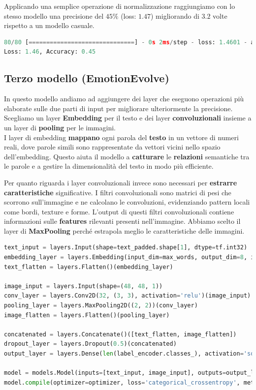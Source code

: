 \documentclass{article}
\begin{document}
Applicando una semplice operazione di normalizzazione raggiungiamo con lo stesso modello una precisione del $45\%$ (loss: $1.47$) migliorando di $3.2$ volte rispetto a un modello casuale.
\begin{lstlisting}[language=Python, caption=Risultati modello normalizzato]
80/80 [==============================] - 0s 2ms/step - loss: 1.4601 - accuracy: 0.4518 - precision_13: 0.6210 - recall_13: 0.2063
Loss: 1.46, Accuracy: 0.45
\end{lstlisting}

\subsection{Terzo modello (EmotionEvolve)}

In questo modello andiamo ad aggiungere dei layer che eseguono operazioni più elaborate sulle due parti di input per migliorare ulteriormente la precisione. Scegliamo un layer \textbf{Embedding} per il testo e dei layer \textbf{convoluzionali} insieme a un layer di \textbf{pooling} per le immagini.\\

I layer di embedding \textbf{mappano} ogni parola del \textbf{testo} in un vettore di numeri reali, dove parole simili sono rappresentate da vettori vicini nello spazio dell'embedding. Questo aiuta il modello a \textbf{catturare} le \textbf{relazioni} semantiche tra le parole e a gestire la dimensionalità del testo in modo più efficiente. 

\bigskip

Per quanto riguarda i layer convoluzionali invece sono necessari per \textbf{estrarre} \textbf{caratteristiche} significative. I filtri convoluzionali sono matrici di pesi che scorrono sull'immagine e ne calcolano le convoluzioni, evidenziando pattern locali come bordi, texture e forme. L'output di questi filtri convoluzionali contiene informazioni sulle \textbf{features} rilevanti presenti nell'immagine. Abbiamo scelto il layer di \textbf{MaxPooling} perché estrapola meglio le caratteristiche delle immagini.
\\
\begin{lstlisting}[language=Python, caption=modello con layer embedding e convoluzionali]
text_input = layers.Input(shape=text_padded.shape[1], dtype=tf.int32)
embedding_layer = layers.Embedding(input_dim=max_words, output_dim=8, input_length=text_padded.shape[1])(text_input)
text_flatten = layers.Flatten()(embedding_layer)

image_input = layers.Input(shape=(48, 48, 1))
conv_layer = layers.Conv2D(32, (3, 3), activation='relu')(image_input)
pooling_layer = layers.MaxPooling2D((2, 2))(conv_layer)
image_flatten = layers.Flatten()(pooling_layer)

concatenated = layers.Concatenate()([text_flatten, image_flatten])
dropout_layer = layers.Dropout(0.5)(concatenated)
output_layer = layers.Dense(len(label_encoder.classes_), activation='softmax')(dropout_layer)

model = models.Model(inputs=[text_input, image_input], outputs=output_layer)
model.compile(optimizer=optimizer, loss='categorical_crossentropy', metrics=['accuracy'])
\end{lstlisting}
\end{document}
